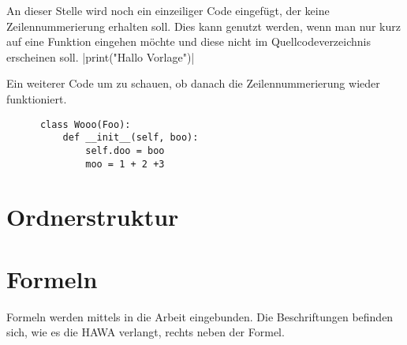 An dieser Stelle wird noch ein einzeiliger Code eingefügt, der keine Zeilennummerierung erhalten soll.
Dies kann genutzt werden, wenn man nur kurz auf eine Funktion eingehen möchte und diese nicht im Quellcodeverzeichnis erscheinen soll.
|print("Hallo Vorlage")|

Ein weiterer Code um zu schauen, ob danach die Zeilennummerierung wieder funktioniert.

\begin{code}[h]
  \begin{verbatim}
      class Wooo(Foo):
          def __init__(self, boo):
              self.doo = boo
              moo = 1 + 2 +3
  \end{verbatim}
  \label{code:example2}
\end{code}
\section{Ordnerstruktur}

    \section{Formeln}
    Formeln werden mittels  in die Arbeit eingebunden.
    Die Beschriftungen befinden sich, wie es die HAWA verlangt, rechts neben der Formel.


